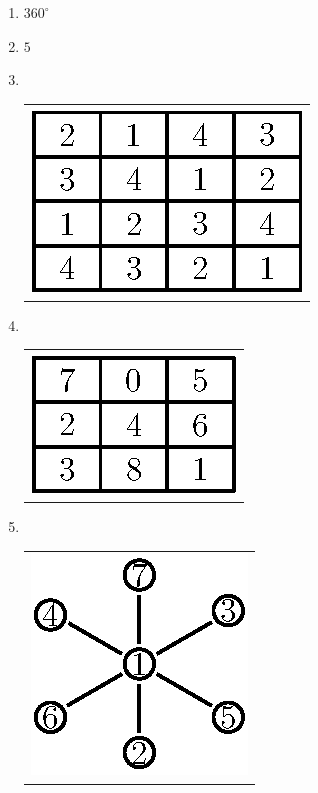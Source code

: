 \begin{enumerate}
\item $360^{\circ}$

\item $5$

  \smallskip
  
\item 
~

  \vskip -0.5cm
  
\begin{tabular}[t]{c}
\centering
\includegraphics{src/figures/ans17.eps}
\end{tabular}



\item 
~

  \vskip -0.5cm
  
\begin{tabular}[t]{c}
\centering
\includegraphics{src/figures/ans18.eps}
\end{tabular}

\medskip

\item 
~

  \vskip -0.5cm
  
\begin{tabular}[t]{c}
\centering
\includegraphics{src/figures/ans19.eps}
\end{tabular}


\end{enumerate}
